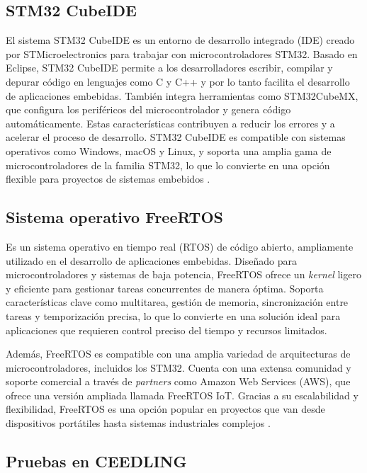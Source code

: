 \subsection{STM32 CubeIDE}
\label{subsec:stm32}

El sistema STM32 CubeIDE es un entorno de desarrollo integrado (IDE) creado por STMicroelectronics para trabajar con microcontroladores STM32. Basado en Eclipse, STM32 CubeIDE permite a los desarrolladores escribir, compilar y depurar código en lenguajes como C y C++ y por lo tanto facilita el desarrollo de aplicaciones embebidas. También integra herramientas como STM32CubeMX, que configura los periféricos del microcontrolador y genera código automáticamente. Estas  características contribuyen a reducir los errores y a acelerar el proceso de desarrollo. STM32 CubeIDE es compatible con sistemas operativos como Windows, macOS y Linux, y soporta una amplia gama de microcontroladores de la familia STM32, lo que lo convierte en una opción flexible para proyectos de sistemas embebidos \citep{WEBSITE:stm32}.

\subsection{Sistema operativo FreeRTOS}
\label{subsec:FreeRTOS}

Es un sistema operativo en tiempo real (RTOS) de código abierto, ampliamente utilizado en el desarrollo de aplicaciones embebidas. Diseñado para microcontroladores y sistemas de baja potencia, FreeRTOS ofrece un \textit{kernel} ligero y eficiente para gestionar tareas concurrentes de manera óptima. Soporta características clave como multitarea, gestión de memoria, sincronización entre tareas y temporización precisa, lo que lo convierte en una solución ideal para aplicaciones que requieren control preciso del tiempo y recursos limitados.

Además, FreeRTOS es compatible con una amplia variedad de arquitecturas de microcontroladores, incluidos los STM32. Cuenta con una extensa comunidad y soporte comercial a través de \textit{partners} como Amazon Web Services (AWS), que ofrece una versión ampliada llamada FreeRTOS IoT. Gracias a su escalabilidad y flexibilidad, FreeRTOS es una opción popular en proyectos que van desde dispositivos portátiles hasta sistemas industriales complejos \citep{WEBSITE:freertos}.

\subsection{Pruebas en CEEDLING}
\label{subsec:CEEDLING}

